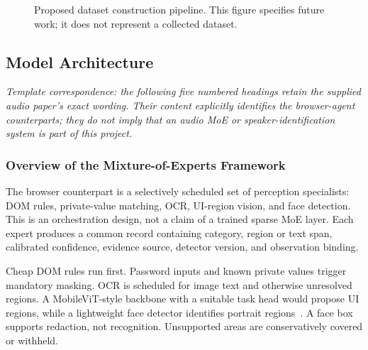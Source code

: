 \documentclass[conference]{IEEEtran}
\begin{document}
\begin{figure}[t]
\centering
{}
\caption{Proposed dataset construction pipeline. This figure specifies future work; it does not represent a collected dataset.}
\label{fig:data}
\end{figure}

\subsection{Model Architecture}
\textit{Template correspondence: the following five numbered headings retain the supplied audio paper's exact wording. Their content explicitly identifies the browser-agent counterparts; they do not imply that an audio MoE or speaker-identification system is part of this project.}

\subsubsection{Overview of the Mixture-of-Experts Framework}
The browser counterpart is a selectively scheduled set of perception specialists: DOM rules, private-value matching, OCR, UI-region vision, and face detection. This is an orchestration design, not a claim of a trained sparse MoE layer. Each expert produces a common record containing category, region or text span, calibrated confidence, evidence source, detector version, and observation binding.

Cheap DOM rules run first. Password inputs and known private values trigger mandatory masking. OCR is scheduled for image text and otherwise unresolved regions. A MobileViT-style backbone with a suitable task head would propose UI regions, while a lightweight face detector identifies portrait regions~\cite{mobilevit,blazeface}. A face box supports redaction, not recognition. Unsupported areas are conservatively covered or withheld.
\end{document}
